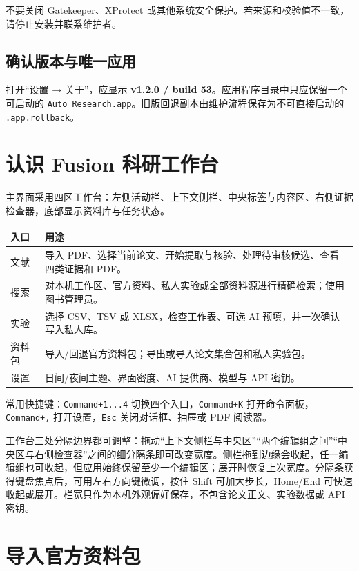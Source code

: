 \documentclass[11pt,a4paper]{ctexart}
\begin{document}
不要关闭 Gatekeeper、XProtect 或其他系统安全保护。若来源和校验值不一致，请停止安装并联系维护者。

\subsection{确认版本与唯一应用}

打开“设置 → 关于”，应显示 \textbf{v1.2.0 / build 53}。应用程序目录中只应保留一个可启动的 \texttt{Auto Research.app}。旧版回退副本由维护流程保存为不可直接启动的 \texttt{.app.rollback}。

\section{认识 Fusion 科研工作台}

主界面采用四区工作台：左侧活动栏、上下文侧栏、中央标签与内容区、右侧证据检查器，底部显示资料库与任务状态。

\begin{longtable}{p{2.4cm}p{10.5cm}}
\toprule
入口 & 用途 \\
\midrule
文献 & 导入 PDF、选择当前论文、开始提取与核验、处理待审核候选、查看四类证据和 PDF。 \\
搜索 & 对本机工作区、官方资料、私人实验或全部资料源进行精确检索；使用图书管理员。 \\
实验 & 选择 CSV、TSV 或 XLSX，检查工作表、可选 AI 预填，并一次确认写入私人库。 \\
资料包 & 导入/回退官方资料包；导出或导入论文集合包和私人实验包。 \\
设置 & 日间/夜间主题、界面密度、AI 提供商、模型与 API 密钥。 \\
\bottomrule
\end{longtable}

常用快捷键：\texttt{Command+1...4} 切换四个入口，\texttt{Command+K} 打开命令面板，\texttt{Command+,} 打开设置，\texttt{Esc} 关闭对话框、抽屉或 PDF 阅读器。

工作台三处分隔边界都可调整：拖动“上下文侧栏与中央区”“两个编辑组之间”“中央区与右侧检查器”之间的细分隔条即可改变宽度。侧栏拖到边缘会收起，任一编辑组也可收起，但应用始终保留至少一个编辑区；展开时恢复上次宽度。分隔条获得键盘焦点后，可用左右方向键微调，按住 Shift 可加大步长，Home/End 可快速收起或展开。栏宽只作为本机外观偏好保存，不包含论文正文、实验数据或 API 密钥。

\section{导入官方资料包}
\end{document}
